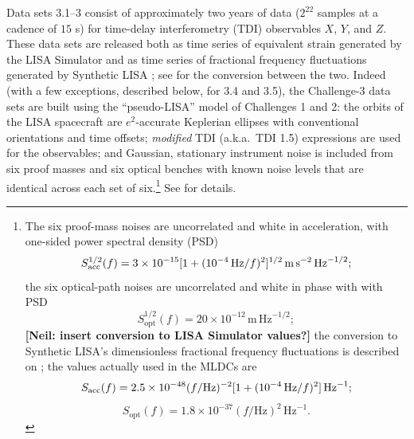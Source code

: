 \documentclass{iopart}
\begin{document}
%
Data sets 3.1--3 consist of approximately two years of data ($2^{22}$ samples at a cadence of $15$ s) for time-delay interferometry (TDI) observables $X$, $Y$, and $Z$. These data sets are released both as time series of equivalent strain generated by the LISA Simulator \cite{lisasimulator} and as time series of fractional frequency fluctuations generated by Synthetic LISA \cite{synthlisa}; see \cite[p.\ S556]{mldcgwdaw2} for the conversion between the two. Indeed (with a few exceptions, described below, for 3.4 and 3.5), the Challenge-3 data sets are built using the ``pseudo-LISA'' model of Challenges 1 and 2: the orbits of the LISA spacecraft are $e^2$-accurate Keplerian ellipses with conventional orientations and time offsets; \emph{modified} TDI (a.k.a.\ TDI 1.5) expressions are used for the observables; and Gaussian, stationary instrument noise is included from six proof masses and six optical benches with known noise levels that are identical across each set of six.\footnote{The six proof-mass noises are uncorrelated and white in acceleration, with one-sided power spectral density (PSD)
%
\begin{displaymath}
S_\mathrm{acc}^{1/2}(f) = 3 \times 10^{-15} [1 + (10^{-4}\,{\rm Hz}/f)^2]^{1/2} \, \mathrm{m}\, \mathrm{s}^{-2}\, \mathrm{Hz}^{-1/2};
\end{displaymath}
%
the six optical-path noises are uncorrelated and white in phase with with PSD
%
\begin{displaymath}
S_\mathrm{opt}^{1/2}(f) = 20 \times 10^{-12} \, \mathrm{m}\, \mathrm{Hz}^{-1/2};
\end{displaymath}
%
\textbf{[Neil: insert conversion to LISA Simulator values?]}
the conversion to Synthetic LISA's dimensionless fractional frequency fluctuations is described on \cite[p.\ 6]{synthlisa}; the values actually used in the MLDCs are
%
\begin{displaymath}
S_\mathrm{acc}(f) = 2.5 \times 10^{-48} (f/\mathrm{Hz})^{-2} [1 + (10^{-4}\,{\rm Hz}/f)^2] \, \mathrm{Hz}^{-1};
\end{displaymath}
\begin{displaymath}
S_\mathrm{opt}(f) = 1.8 \times 10^{-37} (f/\mathrm{Hz})^{2} \, \mathrm{Hz}^{-1}.
\end{displaymath}
} See \cite{mldcgwdaw2} for details.
\end{document}
